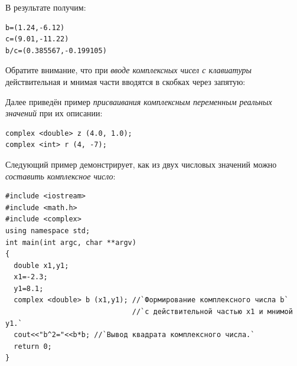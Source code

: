 В результате получим:
\begin{verbatim}
b=(1.24,-6.12)
c=(9.01,-11.22)
b/c=(0.385567,-0.199105)
\end{verbatim}
Обратите внимание, что при \emph{вводе комплексных чисел с клавиатуры} действительная и мнимая части
вводятся в скобках через запятую:


Далее приведён пример \emph{присваивания комплексным переменным реальных значений} при их описании:
\begin{lstlisting}
complex <double> z (4.0, 1.0);
complex <int> r (4, -7);
\end{lstlisting}

Следующий пример демонстрирует, как из двух числовых значений можно \emph{составить комплексное число}:
\begin{lstlisting}
#include <iostream>
#include <math.h>
#include <complex>
using namespace std;
int main(int argc, char **argv)
{
  double x1,y1;
  x1=-2.3;
  y1=8.1;
  complex <double> b (x1,y1); //`Формирование комплексного числа b` 
                              //`с действительной частью x1 и мнимой y1.`
  cout<<"b^2="<<b*b; //`Вывод квадрата комплексного числа.`
  return 0;
}
\end{lstlisting}


